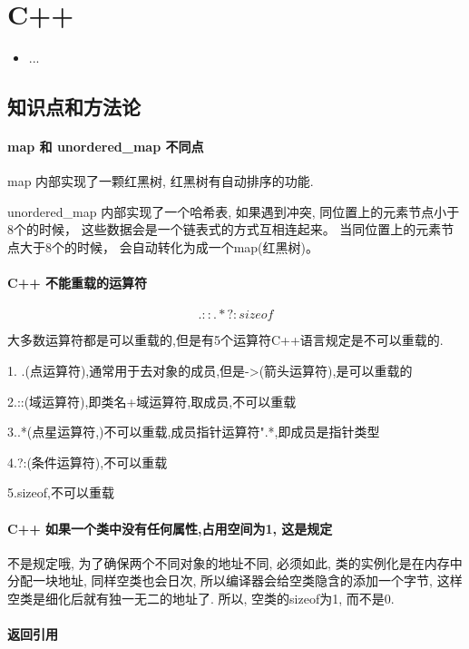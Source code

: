 \chapter{C++}
\label{chap1}
\begin{itemize}[noitemsep,topsep=0pt,parsep=0pt,partopsep=0pt]
	\item ...
\end{itemize}

\section{知识点和方法论}
\subsubsection{map 和 unordered\_map 不同点}

map 内部实现了一颗红黑树, 红黑树有自动排序的功能.

unordered\_map 内部实现了一个哈希表, 如果遇到冲突, 同位置上的元素节点小于8个的时候， 这些数据会是一个链表式的方式互相连起来。 当同位置上的元素节点大于8个的时候， 会自动转化为成一个map(红黑树)。

\subsubsection{C++ 不能重载的运算符}
$$. :: .* ?: sizeof$$

大多数运算符都是可以重载的,但是有5个运算符C++语言规定是不可以重载的.

1. .(点运算符),通常用于去对象的成员,但是->(箭头运算符),是可以重载的

2.::(域运算符),即类名+域运算符,取成员,不可以重载

3..*(点星运算符,)不可以重载,成员指针运算符".*,即成员是指针类型

4.?:(条件运算符),不可以重载

5.sizeof,不可以重载
\subsubsection{C++ 如果一个类中没有任何属性,占用空间为1, 这是规定}

不是规定哦, 为了确保两个不同对象的地址不同, 必须如此, 类的实例化是在内存中分配一块地址, 同样空类也会日次, 所以编译器会给空类隐含的添加一个字节, 这样空类是细化后就有独一无二的地址了. 所以, 空类的sizeof为1, 而不是0.

\subsubsection{返回引用}

